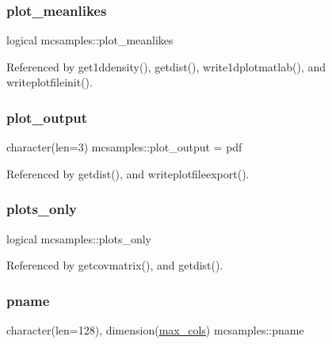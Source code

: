\subsubsection{\texorpdfstring{plot\+\_\+meanlikes}{plot\_meanlikes}}
{\footnotesize\ttfamily logical mcsamples\+::plot\+\_\+meanlikes}



Referenced by get1ddensity(), getdist(), write1dplotmatlab(), and writeplotfileinit().

\mbox{\label{namespacemcsamples_a4aac456ce5052be90e290891a61466f1}} 
\subsubsection{\texorpdfstring{plot\+\_\+output}{plot\_output}}
{\footnotesize\ttfamily character(len=3) mcsamples\+::plot\+\_\+output = \textquotesingle{}pdf\textquotesingle{}}



Referenced by getdist(), and writeplotfileexport().

\mbox{\label{namespacemcsamples_ad6a6de60cc3e044646e884be9bdc3b67}} 
\subsubsection{\texorpdfstring{plots\+\_\+only}{plots\_only}}
{\footnotesize\ttfamily logical mcsamples\+::plots\+\_\+only}



Referenced by getcovmatrix(), and getdist().

\mbox{\label{namespacemcsamples_ae27c34b7ef99d6a3d92c13e419fcceb1}} 
\subsubsection{\texorpdfstring{pname}{pname}}
{\footnotesize\ttfamily character(len=128), dimension(\mbox{\hyperlink{namespacemcsamples_ae8386bad918d8af8d203683c01d5818c}{max\+\_\+cols}}) mcsamples\+::pname}



